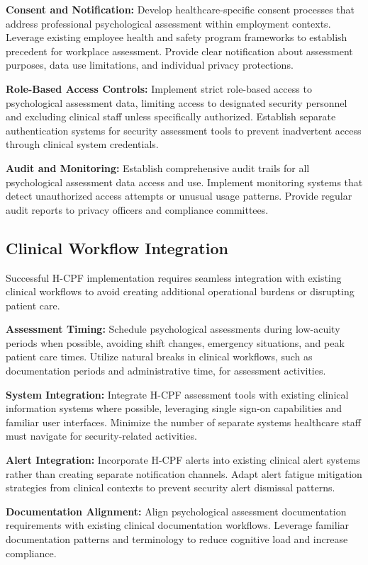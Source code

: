 \documentclass[10pt, twocolumn]{article}
\begin{document}
\textbf{Consent and Notification:} Develop healthcare-specific consent processes that address professional psychological assessment within employment contexts. Leverage existing employee health and safety program frameworks to establish precedent for workplace assessment. Provide clear notification about assessment purposes, data use limitations, and individual privacy protections.

\textbf{Role-Based Access Controls:} Implement strict role-based access to psychological assessment data, limiting access to designated security personnel and excluding clinical staff unless specifically authorized. Establish separate authentication systems for security assessment tools to prevent inadvertent access through clinical system credentials.

\textbf{Audit and Monitoring:} Establish comprehensive audit trails for all psychological assessment data access and use. Implement monitoring systems that detect unauthorized access attempts or unusual usage patterns. Provide regular audit reports to privacy officers and compliance committees.

\subsection{Clinical Workflow Integration}

Successful H-CPF implementation requires seamless integration with existing clinical workflows to avoid creating additional operational burdens or disrupting patient care.

\textbf{Assessment Timing:} Schedule psychological assessments during low-acuity periods when possible, avoiding shift changes, emergency situations, and peak patient care times. Utilize natural breaks in clinical workflows, such as documentation periods and administrative time, for assessment activities.

\textbf{System Integration:} Integrate H-CPF assessment tools with existing clinical information systems where possible, leveraging single sign-on capabilities and familiar user interfaces. Minimize the number of separate systems healthcare staff must navigate for security-related activities.

\textbf{Alert Integration:} Incorporate H-CPF alerts into existing clinical alert systems rather than creating separate notification channels. Adapt alert fatigue mitigation strategies from clinical contexts to prevent security alert dismissal patterns.

\textbf{Documentation Alignment:} Align psychological assessment documentation requirements with existing clinical documentation workflows. Leverage familiar documentation patterns and terminology to reduce cognitive load and increase compliance.
\end{document}
